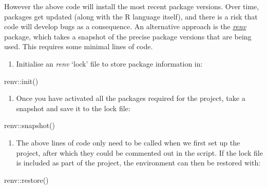 \documentclass[
]{article}
\newenvironment{Shaded}{\begin{snugshade}}{\end{snugshade}}
\newcommand{\FunctionTok}[1]{\textcolor[rgb]{0.00,0.00,0.00}{#1}}
\newcommand{\NormalTok}[1]{#1}
\newcommand{\SpecialCharTok}[1]{\textcolor[rgb]{0.00,0.00,0.00}{#1}}
\providecommand{\tightlist}{%
  \setlength{\itemsep}{0pt}\setlength{\parskip}{0pt}}
\begin{document}
However the above code will install the most recent package versions. Over time, packages get updated (along with the R language itself), and there is a risk that code will develop bugs as a consequence. An alternative approach is the \href{https://rstudio.github.io/renv/articles/renv.html}{\emph{renv}} package, which takes a snapshot of the precise package versions that are being used. This requires some minimal lines of code.

\begin{enumerate}
\def\labelenumi{\arabic{enumi}.}
\tightlist
\item
  Initialise an \emph{renv} `lock' file to store package information in:
\end{enumerate}

\begin{Shaded}
\begin{Highlighting}[]
\NormalTok{renv}\SpecialCharTok{::}\FunctionTok{init}\NormalTok{()}
\end{Highlighting}
\end{Shaded}

\begin{enumerate}
\def\labelenumi{\arabic{enumi}.}
\setcounter{enumi}{1}
\tightlist
\item
  Once you have activated all the packages required for the project, take a snapshot and save it to the lock file:
\end{enumerate}

\begin{Shaded}
\begin{Highlighting}[]
\NormalTok{renv}\SpecialCharTok{::}\FunctionTok{snapshot}\NormalTok{()}
\end{Highlighting}
\end{Shaded}

\begin{enumerate}
\def\labelenumi{\arabic{enumi}.}
\setcounter{enumi}{2}
\tightlist
\item
  The above lines of code only need to be called when we first set up the project, after which they could be commented out in the script. If the lock file is included as part of the project, the environment can then be restored with:
\end{enumerate}

\begin{Shaded}
\begin{Highlighting}[]
\NormalTok{renv}\SpecialCharTok{::}\FunctionTok{restore}\NormalTok{()}
\end{Highlighting}
\end{Shaded}
\end{document}
